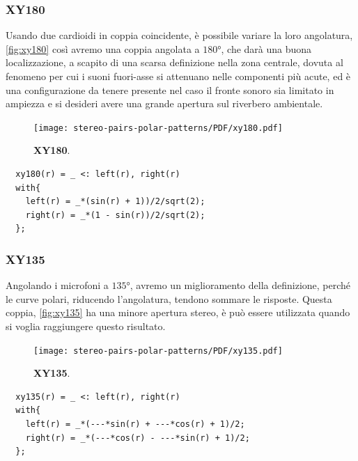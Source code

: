\subsubsection*{XY180}
Usando due cardioidi in coppia coincidente, è possibile variare la loro
angolatura, \ref{fig:xy180} così avremo una coppia angolata a $180°$, che darà una buona
localizzazione, a scapito di una scarsa definizione nella zona centrale,
dovuta al fenomeno per cui i suoni fuori-asse si attenuano nelle componenti più
acute, ed è una configurazione da tenere presente nel caso il fronte sonoro
sia limitato in ampiezza e si desideri avere una grande apertura sul
riverbero ambientale.
\begin{figure}[h]
\begin{center}
\texttt{[image: stereo-pairs-polar-patterns/PDF/xy180.pdf]}
\caption{\textbf{XY180}.}
\label{xy180}
\end{center}
\end{figure}
\begin{lstlisting}
  xy180(r) = _ <: left(r), right(r)
  with{
    left(r) = _*(sin(r) + 1))/2/sqrt(2);
    right(r) = _*(1 - sin(r))/2/sqrt(2);
  };
\end{lstlisting}
\subsubsection*{XY135}
Angolando i microfoni a $135°$, avremo un miglioramento
della definizione, perché le curve polari, riducendo l’angolatura, tendono
sommare le risposte. Questa coppia, \ref{fig:xy135} ha una minore apertura stereo, è può essere
utilizzata quando si voglia raggiungere questo risultato.
\begin{figure}[h]
\begin{center}
\texttt{[image: stereo-pairs-polar-patterns/PDF/xy135.pdf]}
\caption{\textbf{XY135}.}
\label{xy135}
\end{center}
\end{figure}
\begin{lstlisting}
  xy135(r) = _ <: left(r), right(r)
  with{
    left(r) = _*(---*sin(r) + ---*cos(r) + 1)/2;
    right(r) = _*(---*cos(r) - ---*sin(r) + 1)/2;
  };
\end{lstlisting}
